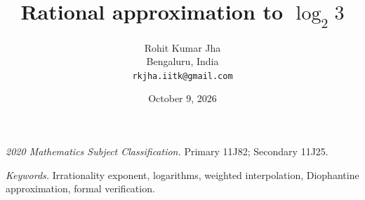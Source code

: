 \documentclass[11pt,oneside]{article}
\title{Rational approximation to \texorpdfstring{$\log_2 3$}{log2 3}}
\author{Rohit Kumar Jha\\
  \small Bengaluru, India\\
  \small\texttt{rkjha.iitk@gmail.com}}
\date{October 9, 2026}
\begin{document}
\maketitle
\begin{abstract}

\end{abstract}
\noindent\textit{2020 Mathematics Subject Classification.}
Primary 11J82; Secondary 11J25.

\smallskip
\noindent\textit{Keywords.}
Irrationality exponent, logarithms, weighted interpolation,
Diophantine approximation, formal verification.

\end{document}
